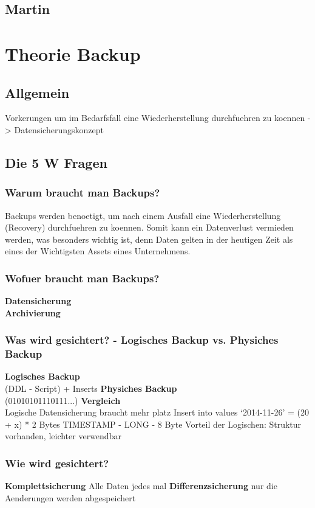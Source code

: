 \documentclass[10pt]{article}
\begin{document}
\subsection{Martin}

\section{Theorie Backup}
\subsection{Allgemein} 
Vorkerungen um im Bedarfsfall eine Wiederherstellung durchfuehren zu koennen -> Datensicherungskonzept
\subsection{Die 5 W Fragen} 
\subsubsection{Warum braucht man Backups?}
Backups werden benoetigt, um nach einem Ausfall eine Wiederherstellung (Recovery) durchfuehren zu koennen.
Somit kann ein Datenverlust vermieden werden, was besonders wichtig ist, denn Daten gelten in der heutigen Zeit als eines der Wichtigsten Assets eines Unternehmens.
\subsubsection{Wofuer braucht man Backups?}
\textbf{Datensicherung} \\


\textbf{Archivierung}	\\
\subsubsection{Was wird gesichtert? - Logisches Backup vs. Physiches Backup}
\textbf{Logisches Backup} \\
(DDL - Script) + Inserts
\textbf{Physiches Backup} \\
(01010101110111...) 
\textbf{Vergleich} \\
Logische Datensicherung braucht mehr platz
Insert into values ‘2014-11-26’ = (20 + x) * 2 Bytes
TIMESTAMP - LONG - 8 Byte 
Vorteil der Logischen: Struktur vorhanden, leichter verwendbar

\subsubsection{Wie wird gesichtert?}
\textbf{Komplettsicherung} 
Alle Daten jedes mal 
 \textbf{Differenzsicherung}
 nur die Aenderungen werden abgespeichert
\end{document}
